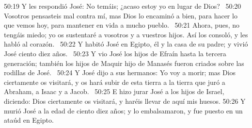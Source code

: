 50:19 Y les respondió José: No temáis; ¿acaso estoy yo en lugar de Dios?  
50:20 Vosotros pensasteis mal contra mí, mas Dios lo encaminó a bien, para hacer lo que vemos hoy, para mantener en vida a mucho pueblo.  
50:21 Ahora, pues, no tengáis miedo; yo os sustentaré a vosotros y a vuestros hijos. Así los consoló, y les habló al corazón.  
50:22 Y habitó José en Egipto, él y la casa de su padre; y vivió José ciento diez años.  
50:23 Y vio José los hijos de Efraín hasta la tercera generación; también los hijos de Maquir hijo de Manasés fueron criados sobre las rodillas de José.  
50:24 Y José dijo a sus hermanos: Yo voy a morir; mas Dios ciertamente os visitará, y os hará subir de esta tierra a la tierra que juró a Abraham, a Isaac y a Jacob.  
50:25 E hizo jurar José a los hijos de Israel, diciendo: Dios ciertamente os visitará, y haréis llevar de aquí mis huesos. 
50:26 Y murió José a la edad de ciento diez años; y lo embalsamaron, y fue puesto en un ataúd en Egipto.  